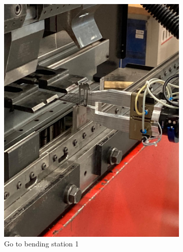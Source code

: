 \begin{figure}[h]
    \centering
    \begin{subfigure}[b]{0.32\textwidth}
        \centering
        \includegraphics[width=\textwidth]{figures/bending/bending6-001.png}
        \caption{Go to bending station 1}
        \label{subfig:bending6-before}
    \end{subfigure}\hspace{0.1cm}
    \begin{subfigure}[b]{0.32\textwidth}
        \centering

\end{subfigure}
\end{figure}
